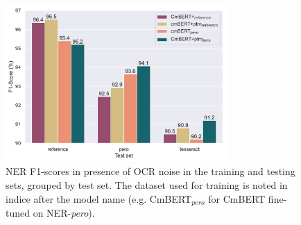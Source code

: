 \begin{figure}
    \centering
    \includegraphics[width=0.75\textwidth]{images/experiment_2_f1_with_noise_graph.pdf}
    \caption{\label{fig:exp_2_eval_ner}NER F1-scores in presence of OCR noise in the training and testing sets, grouped by test set. The dataset used for training is noted in indice after the model name (e.g. CmBERT$_{pero}$ for CmBERT fine-tuned on NER-\emph{pero}).}
\end{figure}

